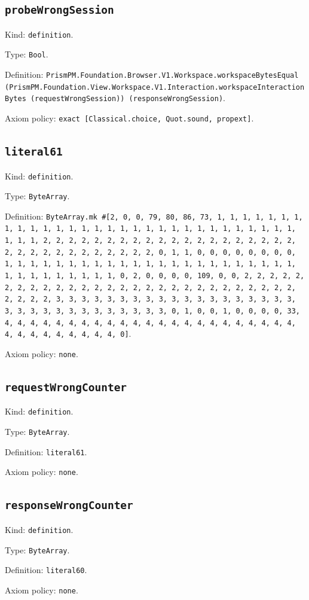 \documentclass[11pt]{article}
\begin{document}
\subsection*{\texttt{probeWrongSession}}
\noindent Kind: \texttt{definition}.\par
\noindent Type: \texttt{Bool}.\par
\noindent Definition: \texttt{PrismPM.Foundation.Browser.V1.Workspace.workspaceBytesEqual (PrismPM.Foundation.View.Workspace.V1.Interaction.workspaceInteractionBytes (requestWrongSession)) (responseWrongSession)}.\par
\noindent Axiom policy: \texttt{exact [Classical.choice, Quot.sound, propext]}.\par
\subsection*{\texttt{literal61}}
\noindent Kind: \texttt{definition}.\par
\noindent Type: \texttt{ByteArray}.\par
\noindent Definition: \texttt{ByteArray.mk \#[2, 0, 0, 79, 80, 86, 73, 1, 1, 1, 1, 1, 1, 1, 1, 1, 1, 1, 1, 1, 1, 1, 1, 1, 1, 1, 1, 1, 1, 1, 1, 1, 1, 1, 1, 1, 1, 1, 1, 1, 2, 2, 2, 2, 2, 2, 2, 2, 2, 2, 2, 2, 2, 2, 2, 2, 2, 2, 2, 2, 2, 2, 2, 2, 2, 2, 2, 2, 2, 2, 2, 2, 0, 1, 1, 0, 0, 0, 0, 0, 0, 0, 0, 1, 1, 1, 1, 1, 1, 1, 1, 1, 1, 1, 1, 1, 1, 1, 1, 1, 1, 1, 1, 1, 1, 1, 1, 1, 1, 1, 1, 1, 1, 1, 1, 0, 2, 0, 0, 0, 0, 109, 0, 0, 2, 2, 2, 2, 2, 2, 2, 2, 2, 2, 2, 2, 2, 2, 2, 2, 2, 2, 2, 2, 2, 2, 2, 2, 2, 2, 2, 2, 2, 2, 2, 2, 3, 3, 3, 3, 3, 3, 3, 3, 3, 3, 3, 3, 3, 3, 3, 3, 3, 3, 3, 3, 3, 3, 3, 3, 3, 3, 3, 3, 3, 3, 3, 3, 0, 1, 0, 0, 1, 0, 0, 0, 0, 33, 4, 4, 4, 4, 4, 4, 4, 4, 4, 4, 4, 4, 4, 4, 4, 4, 4, 4, 4, 4, 4, 4, 4, 4, 4, 4, 4, 4, 4, 4, 4, 4, 0]}.\par
\noindent Axiom policy: \texttt{none}.\par
\subsection*{\texttt{requestWrongCounter}}
\noindent Kind: \texttt{definition}.\par
\noindent Type: \texttt{ByteArray}.\par
\noindent Definition: \texttt{literal61}.\par
\noindent Axiom policy: \texttt{none}.\par
\subsection*{\texttt{responseWrongCounter}}
\noindent Kind: \texttt{definition}.\par
\noindent Type: \texttt{ByteArray}.\par
\noindent Definition: \texttt{literal60}.\par
\noindent Axiom policy: \texttt{none}.\par
\end{document}
